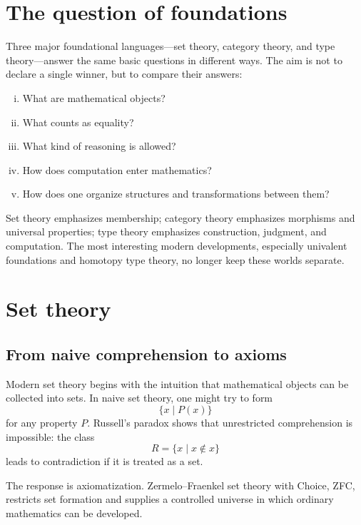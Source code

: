 
\section{The question of foundations}

Three major foundational languages---set theory, category theory, and type theory---answer the same basic questions in different ways.  The aim is not to declare a single winner, but to compare their answers:
\begin{enumerate}[(i)]
  \item What are mathematical objects?
  \item What counts as equality?
  \item What kind of reasoning is allowed?
  \item How does computation enter mathematics?
  \item How does one organize structures and transformations between them?
\end{enumerate}

Set theory emphasizes membership; category theory emphasizes morphisms and universal properties; type theory emphasizes construction, judgment, and computation.  The most interesting modern developments, especially univalent foundations and homotopy type theory, no longer keep these worlds separate.

\section{Set theory}

\subsection{From naive comprehension to axioms}

Modern set theory begins with the intuition that mathematical objects can be collected into sets.  In naive set theory, one might try to form
\[
  \{x\mid P(x)\}
\]
for any property \(P\).  Russell's paradox shows that unrestricted comprehension is impossible: the class
\[
  R=\{x\mid x\notin x\}
\]
leads to contradiction if it is treated as a set.

The response is axiomatization.  Zermelo--Fraenkel set theory with Choice, ZFC, restricts set formation and supplies a controlled universe in which ordinary mathematics can be developed.

